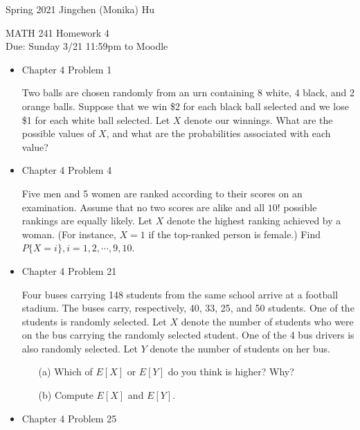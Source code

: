 \documentclass[11pt]{article}
\begin{document}
\enlargethispage{\baselineskip}

Spring 2021 \hfill Jingchen (Monika) Hu\\

\begin{center}
{\huge MATH 241 Homework 4}	\\
Due: Sunday 3/21 11:59pm to Moodle
\end{center}
\vspace{0.5cm}

\begin{itemize}

    \item
    Chapter 4 Problem 1
    
    Two balls are chosen randomly from an urn containing 8 white, 4 black, and 2 orange balls. Suppose that we win \$2 for each black ball selected and we lose \$1 for each white ball selected. Let $X$ denote our winnings. What are the possible values of $X$, and what are the probabilities associated with each value?
    
    \item
    Chapter 4 Problem 4
    
    Five men and 5 women are ranked according to their scores on an examination. Assume that no two scores are alike and all $10!$ possible rankings are equally likely. Let $X$ denote the highest ranking achieved by a woman. (For instance, $X = 1$ if the top-ranked person is female.) Find $P\{X = i\}, i = 1, 2, \cdots, 9, 10$.

    \item
    Chapter 4 Problem  21
    
    Four buses carrying 148 students from the same school arrive at a football stadium. The buses carry, respectively, 40, 33, 25, and 50 students. One of the students is randomly selected. Let $X$ denote the number of students who were on the bus carrying the randomly selected student. One of the 4 bus drivers is also randomly selected. Let $Y$ denote the number of students on her bus.
    
    \begin{itemize}
    \item[(a)] Which of $E[X]$ or $E[Y]$ do you think is higher? Why?
    \item[(b)] Compute $E[X]$ and $E[Y]$.
    \end{itemize}

    \item
    Chapter 4 Problem  25
    

\end{itemize}
\end{document}
